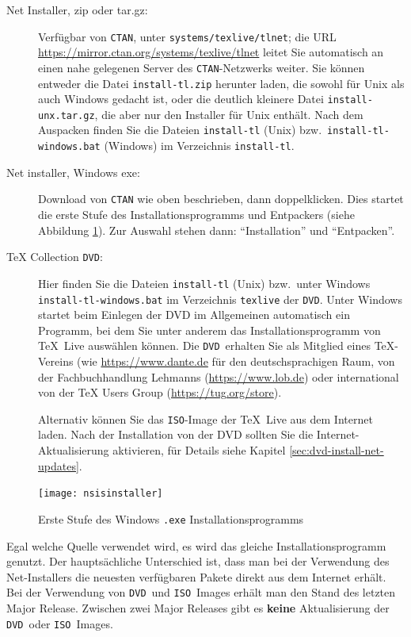 \documentclass[12pt,ngerman,a4paper,fullparskip]{scrreprt}
\newcommand{\TL}{\TeX\ Live\xspace}
\newcommand{\acro}[1]{\texttt{#1}}
\newcommand{\code}[1]{\texttt{#1}}
\newcommand{\filename}[1]{\texttt{#1}}
\newcommand{\dirname}[1]{\texttt{#1}}
\providecommand*{\CTAN}{\acro{CTAN}\xspace}
\providecommand*{\DVD}{\acro{DVD}\xspace}
\providecommand*{\ISO}{\acro{ISO}\xspace}
\begin{document}
\begin{description}
\item [Net Installer, zip oder tar.gz:] Verfügbar von \CTAN, unter
\dirname{systems/texlive/tlnet}; die URL
\url{https://mirror.ctan.org/systems/texlive/tlnet} leitet Sie automatisch
an einen nahe gelegenen Server des \CTAN-Netzwerks weiter.
Sie können entweder die Datei \filename{install-tl.zip} herunter laden,
die sowohl für Unix als auch Windows gedacht ist,
oder die deutlich kleinere Datei \filename{install-unx.tar.gz},
die aber nur den Installer für Unix enthält.
Nach dem Auspacken finden Sie die Dateien \filename{install-tl} (Unix)
bzw.\ \filename{install-tl-windows.bat} (Windows) im Verzeichnis \dirname{install-tl}.

\item[Net installer, Windows exe:] Download von \CTAN{} wie oben beschrieben, dann doppelklicken. Dies startet
die erste Stufe des Installationsprogramms und Entpackers (siehe Abbildung \ref{fig:nsis}). Zur Auswahl stehen dann: 
\enquote{Installation} und \enquote{Entpacken}.


\item [\TeX{} Collection \DVD:] Hier finden Sie die Dateien \filename{install-tl} (Unix)
bzw.\  unter Windows \filename{install-tl-windows.bat} im Verzeichnis \dirname{texlive}
der \DVD. Unter Windows startet beim Einlegen der DVD im Allgemeinen automatisch ein Programm, bei dem Sie unter anderem das Installationsprogramm von \TL auswählen können.  Die \DVD\ erhalten Sie als Mitglied eines \TeX-Vereins (wie \url{https://www.dante.de} für den deutschsprachigen Raum, von der Fachbuchhandlung Lehmanns (\url{https://www.lob.de}) oder international von der \TeX{} Users Group (\url{https://tug.org/store}). 

Alternativ können Sie das \ISO-Image der \TL aus dem Internet laden. Nach der Installation von der DVD sollten Sie die Internet-Aktualisierung aktivieren, für Details siehe Kapitel \ref{sec:dvd-install-net-updates}.
\end{description}

\begin{figure}[tb]
\centering
\texttt{[image: nsisinstaller]}
\caption{Erste Stufe des Windows \code{.exe} Installationsprogramms}\label{fig:nsis}
\end{figure}

Egal welche Quelle verwendet wird, es wird das gleiche Installationsprogramm genutzt. Der hauptsächliche Unterschied ist, dass man bei der Verwendung des Net-Installers die neuesten verfügbaren Pakete direkt aus dem Internet erhält. Bei der Verwendung von \DVD\ und \ISO\ Images erhält man den Stand des letzten Major Release. Zwischen zwei Major Releases gibt es \textbf{keine} Aktualisierung der \DVD\ oder \ISO\ Images.
\end{document}
